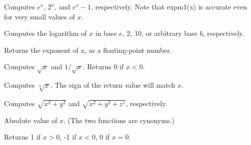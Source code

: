 \documentclass[11pt,letterpaper]{book}
\begin{document}
  
Computes $e^x$, $2^x$, and $e^x-1$, respectively.  Note that 
{\cf expm1(x)} is accurate even for very small values of $x$.
\apiend

  
Computes the logarithm of $x$ in base $e$, 2, 10, or arbitrary base $b$,
respectively.
\apiend

Returns the exponent of x, as a floating-point number.
\apiend

 
Computes $\sqrt{x}$ and $1/\sqrt{x}$.  Returns 0 if $x<0$.
\apiend

Computes $\sqrt[3]{x}$. The sign of the return value will match $x$.
\apiend

Computes $\sqrt{x^2+y^2}$ and $\sqrt{x^2+y^2+z^z}$, respectively.
\apiend

 
Absolute value of $x$.  (The two functions are synonyms.)
\apiend


Returns 1 if $x>0$, -1 if $x<0$, 0 if $x=0$.
\apiend
\end{document}
